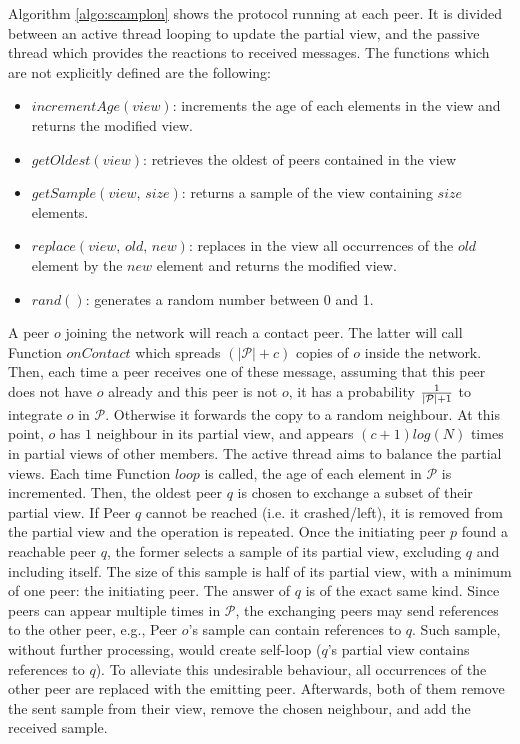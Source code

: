 \begin{asparadesc}
\item [Algorithm]\ref{algo:scamplon} shows the \SCAMPLON{} protocol running at
  each peer. It is divided between an active thread looping to update the
  partial view, and the passive thread which provides the reactions to received
  messages. The functions which are not explicitly defined are the following:
  \begin{itemize}
  \item $incrementAge(view)$: increments the age of each elements in the view
    and returns the modified view.
  \item $getOldest(view)$: retrieves the oldest of peers contained in the view
  \item $getSample(view, \, size)$: returns a sample of the view containing
    $size$ elements.
  \item $replace(view,\,old,\,new)$: replaces in the view all occurrences of the
    $old$ element by the $new$ element and returns the modified view.
  \item $rand()$: generates a random number between 0 and 1.
  \end{itemize}
  A peer $o$ joining the network will reach a contact peer. The latter will
  call Function $onContact$ which spreads $(|\mathcal{P}|+c)$ copies of $o$
  inside the network. Then, each time a peer receives one of these message,
  assuming that this peer does not have $o$ already and this peer is not $o$,
  it has a probability $1\over{|\mathcal{P}|+1}$ to integrate $o$ in
  $\mathcal{P}$. Otherwise it forwards the copy to a random neighbour.  At this
  point, $o$ has $1$ neighbour in its partial view, and appears $(c+1)log(N)$
  times in partial views of other members. The active thread aims to balance
  the partial views. Each time Function $loop$ is called, the age of each
  element in $\mathcal{P}$ is incremented. Then, the oldest peer $q$ is chosen
  to exchange a subset of their partial view. If Peer $q$ cannot be reached
  (i.e. it crashed/left), it is removed from the partial view and the
  operation is repeated. Once the initiating peer $p$ found a reachable peer
  $q$, the former selects a sample of its partial view, excluding $q$ and
  including itself. The size of this sample is half of its partial view, with a
  minimum of one peer: the initiating peer. The answer of $q$ is of the exact
  same kind. Since peers can appear multiple times in $\mathcal{P}$, the
  exchanging peers may send references to the other peer, e.g., Peer $o$'s
  sample can contain references to $q$. Such sample, without further
  processing, would create self-loop ($q$'s partial view contains references to
  $q$). To alleviate this undesirable behaviour, all occurrences of the other
  peer are replaced with the emitting peer.  Afterwards, both of them remove
  the sent sample from their view, remove the chosen neighbour, and add the
  received sample.
\end{asparadesc}

